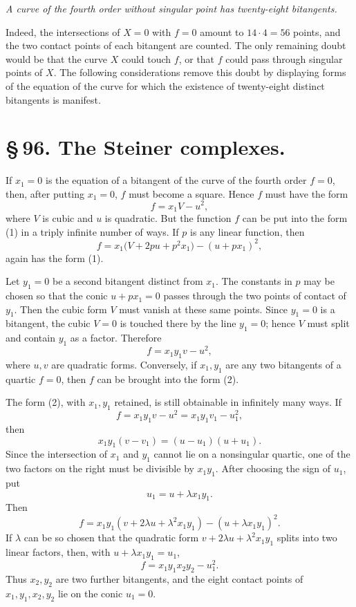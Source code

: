 \documentclass[11pt]{article}
\begin{document}
\emph{A curve of the fourth order without singular point has twenty-eight bitangents.}

Indeed, the intersections of \(X=0\) with \(f=0\) amount to \(14\cdot4=56\) points, and the two contact points of each bitangent are counted. The only remaining doubt would be that the curve \(X\) could touch \(f\), or that \(f\) could pass through singular points of \(X\). The following considerations remove this doubt by displaying forms of the equation of the curve for which the existence of twenty-eight distinct bitangents is manifest.

\section*{\S\,96. The Steiner complexes.}

If \(x_1=0\) is the equation of a bitangent of the curve of the fourth order \(f=0\), then, after putting \(x_1=0\), \(f\) must become a square. Hence \(f\) must have the form
\begin{equation}
 f=x_1V-u^2,
 \tag{1}
\end{equation}
where \(V\) is cubic and \(u\) is quadratic. But the function \(f\) can be put into the form (1) in a triply infinite number of ways. If \(p\) is any linear function, then
\[
 f=x_1\bigl(V+2pu+p^2x_1\bigr)-(u+px_1)^2,
\]
again has the form (1).

Let \(y_1=0\) be a second bitangent distinct from \(x_1\). The constants in \(p\) may be chosen so that the conic \(u+px_1=0\) passes through the two points of contact of \(y_1\). Then the cubic form \(V\) must vanish at these same points. Since \(y_1=0\) is a bitangent, the cubic \(V=0\) is touched there by the line \(y_1=0\); hence \(V\) must split and contain \(y_1\) as a factor. Therefore
\begin{equation}
 f=x_1y_1v-u^2,
 \tag{2}
\end{equation}
where \(u,v\) are quadratic forms. Conversely, if \(x_1,y_1\) are any two bitangents of a quartic \(f=0\), then \(f\) can be brought into the form (2).

The form (2), with \(x_1,y_1\) retained, is still obtainable in infinitely many ways. If
\[
 f=x_1y_1v-u^2=x_1y_1v_1-u_1^2,
\]
then
\begin{equation}
 x_1y_1(v-v_1)=(u-u_1)(u+u_1).
 \tag{3}
\end{equation}
Since the intersection of \(x_1\) and \(y_1\) cannot lie on a nonsingular quartic, one of the two factors on the right must be divisible by \(x_1y_1\). After choosing the sign of \(u_1\), put
\[
 u_1=u+\lambda x_1y_1.
\]
Then
\begin{equation}
 f=x_1y_1(v+2\lambda u+\lambda^2x_1y_1)-(u+\lambda x_1y_1)^2.
 \tag{4}
\end{equation}
If \(\lambda\) can be so chosen that the quadratic form \(v+2\lambda u+\lambda^2x_1y_1\) splits into two linear factors, then, with \(u+\lambda x_1y_1=u_1\),
\begin{equation}
 f=x_1y_1x_2y_2-u_1^2.
 \tag{5}
\end{equation}
Thus \(x_2,y_2\) are two further bitangents, and the eight contact points of \(x_1,y_1,x_2,y_2\) lie on the conic \(u_1=0\).
\end{document}
